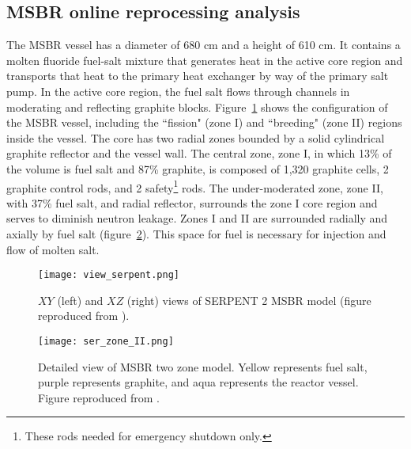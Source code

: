 \subsection{MSBR online reprocessing analysis} \label{sec:msbr_reproc}
The \gls{MSBR} vessel has a diameter of 680 cm and a height of 610 cm. It 
contains a molten fluoride fuel-salt mixture that generates heat in the active 
core region and transports that heat to the primary heat exchanger by way of 
the primary salt pump. In the active core region, the fuel salt flows through 
channels in moderating and reflecting graphite blocks. 
Figure~\ref{fig:serpent_plan_view} shows the configuration of the 
\gls{MSBR} vessel, including the ``fission" (zone I) and ``breeding" 
(zone II) regions inside the vessel. The core has two radial zones bounded by a 
solid cylindrical graphite reflector and the vessel wall. The central zone, 
zone I, in which 13\% of the volume is fuel salt and 87\% graphite, is
composed of 1,320 graphite cells, 2 graphite control rods, and 2 
safety\footnote{ These rods needed for emergency shutdown only.} rods. The 
under-moderated zone, zone II, with 37\% fuel salt, and radial reflector, 
surrounds the zone I core region and serves to diminish neutron leakage. Zones 
I and II are surrounded radially and axially by fuel salt 
(figure~\ref{fig:serpent_zoneII}). This space for fuel is necessary for 
injection and flow of molten salt.
\begin{figure}[hbp!] %
  \texttt{[image: view\_serpent.png]}
  \caption{$XY$ (left) and $XZ$ (right) views of SERPENT 2 \gls{MSBR} model 
(figure reproduced from \cite{rykhlevskii_full-core_2017}).}
  \label{fig:serpent_plan_view}
\end{figure}
\begin{figure}[t!] %
  \texttt{[image: ser\_zone\_II.png]}
  \caption{Detailed view of \gls{MSBR} two zone model. 
          Yellow represents fuel salt, purple represents graphite, and aqua represents the reactor vessel. Figure reproduced from \cite{rykhlevskii_full-core_2017}.}
  \label{fig:serpent_zoneII}
\end{figure}

